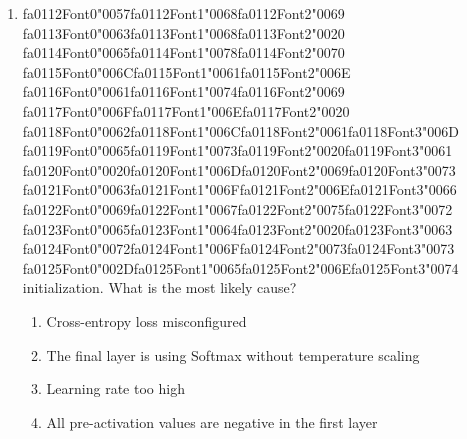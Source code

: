 \documentclass[12pt]{article}
\begin{document}
\begin{enumerate}[label=Q\arabic*.]
 \item {\csname fa0112Font0\endcsname\char"0057}{\csname fa0112Font1\endcsname\char"0068}{\csname fa0112Font2\endcsname\char"0069} {\csname fa0113Font0\endcsname\char"0063}{\csname fa0113Font1\endcsname\char"0068}{\csname fa0113Font2\endcsname\char"0020} {\csname fa0114Font0\endcsname\char"0065}{\csname fa0114Font1\endcsname\char"0078}{\csname fa0114Font2\endcsname\char"0070} {\csname fa0115Font0\endcsname\char"006C}{\csname fa0115Font1\endcsname\char"0061}{\csname fa0115Font2\endcsname\char"006E} {\csname fa0116Font0\endcsname\char"0061}{\csname fa0116Font1\endcsname\char"0074}{\csname fa0116Font2\endcsname\char"0069} {\csname fa0117Font0\endcsname\char"006F}{\csname fa0117Font1\endcsname\char"006E}{\csname fa0117Font2\endcsname\char"0020} {\csname fa0118Font0\endcsname\char"0062}{\csname fa0118Font1\endcsname\char"006C}{\csname fa0118Font2\endcsname\char"0061}{\csname fa0118Font3\endcsname\char"006D} {\csname fa0119Font0\endcsname\char"0065}{\csname fa0119Font1\endcsname\char"0073}{\csname fa0119Font2\endcsname\char"0020}{\csname fa0119Font3\endcsname\char"0061} {\csname fa0120Font0\endcsname\char"0020}{\csname fa0120Font1\endcsname\char"006D}{\csname fa0120Font2\endcsname\char"0069}{\csname fa0120Font3\endcsname\char"0073} {\csname fa0121Font0\endcsname\char"0063}{\csname fa0121Font1\endcsname\char"006F}{\csname fa0121Font2\endcsname\char"006E}{\csname fa0121Font3\endcsname\char"0066} {\csname fa0122Font0\endcsname\char"0069}{\csname fa0122Font1\endcsname\char"0067}{\csname fa0122Font2\endcsname\char"0075}{\csname fa0122Font3\endcsname\char"0072} {\csname fa0123Font0\endcsname\char"0065}{\csname fa0123Font1\endcsname\char"0064}{\csname fa0123Font2\endcsname\char"0020}{\csname fa0123Font3\endcsname\char"0063} {\csname fa0124Font0\endcsname\char"0072}{\csname fa0124Font1\endcsname\char"006F}{\csname fa0124Font2\endcsname\char"0073}{\csname fa0124Font3\endcsname\char"0073} {\csname fa0125Font0\endcsname\char"002D}{\csname fa0125Font1\endcsname\char"0065}{\csname fa0125Font2\endcsname\char"006E}{\csname fa0125Font3\endcsname\char"0074} initialization. What is the most likely cause?
 \begin{enumerate}[label=(\Alph*)]
     \item Cross-entropy loss misconfigured
     \item The final layer is using Softmax without temperature scaling
     \item Learning rate too high
     \item All pre-activation values are negative in the first layer
 \end{enumerate}
 

\end{enumerate}
\end{document}
